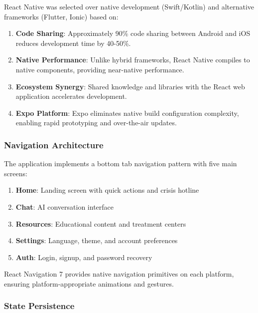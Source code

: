 React Native was selected over native development (Swift/Kotlin) and alternative frameworks (Flutter, Ionic) based on:

\begin{enumerate}
    \item \textbf{Code Sharing}: Approximately 90\% code sharing between Android and iOS reduces development time by 40-50\%.
    
    \item \textbf{Native Performance}: Unlike hybrid frameworks, React Native compiles to native components, providing near-native performance.
    
    \item \textbf{Ecosystem Synergy}: Shared knowledge and libraries with the React web application accelerates development.
    
    \item \textbf{Expo Platform}: Expo eliminates native build configuration complexity, enabling rapid prototyping and over-the-air updates.
\end{enumerate}

\subsubsection{Navigation Architecture}

The application implements a bottom tab navigation pattern with five main screens:

\begin{enumerate}
    \item \textbf{Home}: Landing screen with quick actions and crisis hotline
    \item \textbf{Chat}: AI conversation interface
    \item \textbf{Resources}: Educational content and treatment centers
    \item \textbf{Settings}: Language, theme, and account preferences
    \item \textbf{Auth}: Login, signup, and password recovery
\end{enumerate}

React Navigation 7 provides native navigation primitives on each platform, ensuring platform-appropriate animations and gestures.

\subsubsection{State Persistence}

